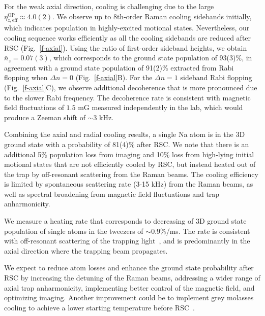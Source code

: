 \documentclass[aps,prl,twocolumn,groupedaddress]{revtex4-1}
\begin{document}
For the weak axial direction, cooling is challenging
due to the large $\eta^{\textrm{OP}}_{z,\textrm{eff}}\approx 4.0(2)$.
We observe up to 8th-order Raman cooling sidebands initially,
which indicates population in highly-excited motional states.
Nevertheless, our cooling sequence works efficiently as all the cooling sidebands are reduced
after RSC (Fig.~\ref{f-axial}).
Using the ratio of first-order sideband heights, we obtain $\bar{n}_z=0.07(3)$, which corresponds to the ground state population of 
93(3)\%, in agreement with a ground state population of 91(2)\% extracted from  Rabi flopping 
when $\Delta n=0$ (Fig.~\ref{f-axial}B).
For the $\Delta n=1$ sideband Rabi flopping (Fig.~\ref{f-axial}C),
we observe additional decoherence that is more pronounced due to the slower Rabi frequency.
The decoherence rate is consistent with magnetic field fluctuations of $1.5$ mG measured independently in the lab, which would produce a Zeeman shift of $\sim 3$ kHz.

Combining the axial and radial cooling results,
 a single Na atom is in  the 3D ground state  with a probability of 81(4)\% after RSC. 
 We note that there is an additional 5\% population loss from  imaging  and 10\% loss
from  high-lying initial motional states that are not efficiently cooled by RSC,
but instead heated out of the trap by off-resonant scattering from the Raman beams.
The cooling efficiency is limited by spontaneous scattering rate (3-15 kHz) from the Raman beams, as well as spectral broadening from magnetic field fluctuations and trap anharmonicity.


We measure a heating rate that corresponds to  decreasing of 3D ground state population of single atoms in the tweezers  of  $\sim0.9$\%/ms. 
The  rate is consistent with off-resonant scattering of the trapping light~\cite{Grimm2000}, and is predominantly in the axial direction where the trapping beam propagates. 


We expect to reduce atom losses and enhance the ground state probability after RSC
by increasing the detuning of the Raman beams,
addressing a wider range of axial trap anharmonicity, %
implementing better control of the magnetic field, and optimizing imaging.
Another improvement could be to implement grey molasses cooling to achieve
a lower starting temperature before RSC~\cite{Colzi2016}.
\end{document}
